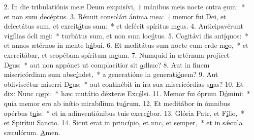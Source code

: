 2. In die tribulatiónis meæ Deum exquisívi,~† mánibus meis nocte cntra \uline{e}um:~* et non sum dec\uline{é}ptus.
3. Rénuit consolári ánima mea:~† memor fui Dei, et delectátus sum, et exrcit\uline{á}tus sum:~* et defécit spíritus m\uline{e}us.
4. Anticipavérunt vigílias ócli m\uline{e}i:~* turbátus sum, et non sum loc\uline{ú}tus.
5. Cogitávi dis ant\uline{í}quos:~* et annos ætérnos in mente h\uline{á}bui.
6. Et meditátus sum nocte cum crde m\uline{e}o,~* et exercitábar, et scopébam spíritum m\uline{e}um.
7. Numquid in ætérnum projícet D\uline{e}us:~* aut non appónet ut complacítior sit \uline{a}dhuc?
8. Aut in finem misericórdiam sum absc\uline{í}ndet,~* a generatióne in generati\uline{ó}nem?
9. Aut obliviscétur miserri D\uline{e}us:~* aut continébit in ira sua misericórdias s\uline{u}as?
10. Et dix: Nunc c\uline{œ}pi:~* hæc mutátio déxteræ Exc\uline{é}lsi.
11. Memor fui óprum D\uline{ó}mini:~* quia memor ero ab inítio mirabílium tu\uline{ó}rum.
12. Et meditábor in ómnibus opérbus t\uline{u}is:~* et in adinventiónibus tuis exerc\uline{é}bor.
13. Glória Patr, et F\uline{í}lio,~* et Spirítui S\uline{a}ncto.
14. Sicut erat in princípio, et nnc, et s\uline{e}mper,~* et in sǽcula sæculórum. \uline{A}men.
